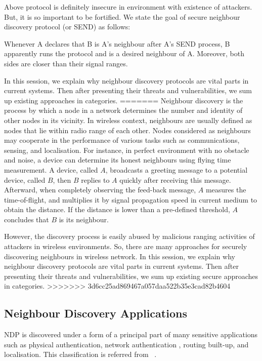 Above protocol is definitely insecure in environment with existence of attackers. But, it is so important to be fortified. We state the goal of secure neighbour discovery protocol (or SEND) as follows: 

\begin{Definition}
Whenever A declares that B is A’s neighbour after A’s SEND process, B apparently runs the protocol and is a desired neighbour of A. Moreover, both sides are closer than their signal ranges.
\end{Definition}

In this session, we explain why neighbour discovery protocols are vital parts in current systems. Then after presenting their threats and vulnerabilities, we sum up existing approaches in categories.
=======
Neighbour discovery is the process by which a node in a network determines the number and identity of other nodes in its vicinity. In wireless context, neighbours are usually defined as nodes that lie within radio range of each other. Nodes considered as neighbours may cooperate in the performance of various tasks such as communications, sensing, and localisation. For instance, in perfect environment with no obstacle and noise, a device can determine its honest neighbours using flying time measurement. A device, called $A$, broadcasts a greeting message to a potential device, called $B$, then $B$ replies to $A$ quickly after receiving this message. Afterward, when completely observing the feed-back message, $A$ measures the time-of-flight, and multiplies it by signal propagation speed in current medium to obtain the distance. If the distance is lower than a pre-defined threshold, $A$ concludes that $B$ is its neighbour.

However, the discovery process is easily abused by malicious ranging activities of attackers in wireless environments. So, there are many approaches for securely discovering neighbours in wireless network. In this session, we explain why neighbour discovery protocols are vital parts in current systems. Then after presenting their threats and vulnerabilities, we sum up existing secure approaches in categories.
>>>>>>> 3d6cc25ad869467a057daa522b35e3cad82b4604

\subsection{Neighbour Discovery Applications}

NDP is discovered under a form of a principal part of many sensitive applications such as physical authentication, network authentication , routing built-up, and localisation. This classification is referred from ~\cite{Marcinthesis}.

